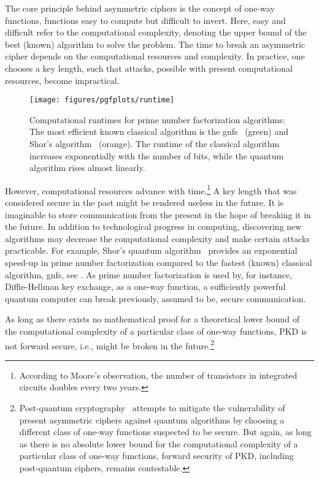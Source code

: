The core principle behind asymmetric ciphers is the concept of one-way functions, functions easy to compute but difficult to invert.
Here, easy and difficult refer to the computational complexity, denoting the upper bound of the best (known) algorithm to solve the problem.
The time to break an asymmetric cipher depends on the computational resources and complexity.
In practice, one chooses a key length, such that attacks, possible with present computational resources, become impractical.
\begin{figure}[htb]
	\centering
	\texttt{[image: figures/pgfplots/runtime]}
	\caption{Computational runtimes for prime number factorization algorithms: The most efficient known classical algorithm is the \gls{gnfs}~\cite{Lenstra1993} (green) and Shor's algorithm~\cite{Shor1994} (orange). The runtime of the classical algorithm increases exponentially with the number of bits, while the quantum algorithm rises almost linearly.}
	\label{fig:prime_number_factorization_runtime}
\end{figure}
However, computational resources advance with time.\footnote{According to Moore's observation, the number of transistors in integrated circuits doubles every two years.}
A key length that was considered secure in the past might be rendered useless in the future.
It is imaginable to store communication from the present in the hope of breaking it in the future.
In addition to technological progress in computing, discovering new algorithms may decrease the computational complexity and make certain attacks practicable.
For example, Shor's quantum algorithm~\cite{Shor1994} provides an exponential speed-up in prime number factorization compared to the fastest (known) classical algorithm, \gls{gnfs}, see .
As prime number factorization is used by, for instance, Diffie-Hellman key exchange, as a one-way function, a sufficiently powerful quantum computer can break previously, assumed to be, secure communication.

As long as there exists no mathematical proof for a theoretical lower bound of the computational complexity of a particular class of one-way functions, PKD is not forward secure, i.e., might be broken in the future.\footnote{Post-quantum cryptography~\cite{Bernstein2017,Chen2016} attempts to mitigate the vulnerability of present asymmetric ciphers against quantum algorithms by choosing a different class of one-way functions suspected to be secure. But again, as long as there is no absolute lower bound for the computational complexity of a particular class of one-way functions, forward security of PKD, including post-quantum ciphers, remains contestable.}


